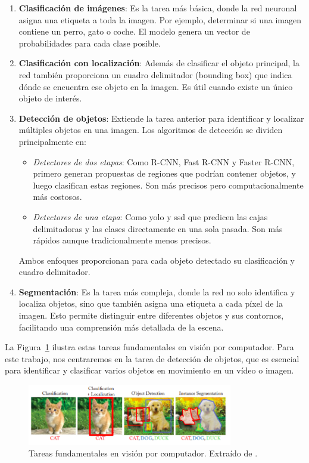 \documentclass[11pt,spanish,listoffigures,listoftables]{tfgetsinf}
\begin{document}
\begin{enumerate}
    \item \textbf{Clasificación de imágenes}: Es la tarea más básica, donde la red neuronal asigna una etiqueta a toda la imagen. Por ejemplo, determinar si una imagen contiene un perro, gato o coche. El modelo genera un vector de probabilidades para cada clase posible.
    
    \item \textbf{Clasificación con localización}: Además de clasificar el objeto principal, la red también proporciona un cuadro delimitador (bounding box) que indica dónde se encuentra ese objeto en la imagen. Es útil cuando existe un único objeto de interés.
    
   \item \textbf{Detección de objetos}: Extiende la tarea anterior para identificar y localizar múltiples objetos en una imagen. Los algoritmos de detección se dividen principalmente en:
      \begin{itemize}
         \item \textit{Detectores de dos etapas}: Como R-CNN, Fast R-CNN y Faster R-CNN, primero generan propuestas de regiones que podrían contener objetos, y luego clasifican estas regiones. Son más precisos pero computacionalmente más costosos.
         \item \textit{Detectores de una etapa}: Como \gls{yolo} y \gls{ssd} que predicen las cajas delimitadoras y las clases directamente en una sola pasada. Son más rápidos aunque tradicionalmente menos precisos.
      \end{itemize}
      Ambos enfoques proporcionan para cada objeto detectado su clasificación y cuadro delimitador.
    
    \item \textbf{Segmentación}: Es la tarea más compleja, donde la red no solo identifica y localiza objetos, sino que también asigna una etiqueta a cada píxel de la imagen. Esto permite distinguir entre diferentes objetos y sus contornos, facilitando una comprensión más detallada de la escena.
\end{enumerate}

La Figura~\ref{fig:tareas_vision_por_computador} ilustra estas tareas fundamentales en visión por computador. Para este trabajo, nos centraremos en la tarea de detección de objetos, que es esencial para identificar y clasificar varios objetos en movimiento en un vídeo o imagen.

\begin{figure}[H]
   \centering
   \includegraphics[width=0.8\textwidth]{images/estado_del_arte/diferentes_formas_de_detectar.png}
   \caption[Tareas fundamentales en visión por computador]{Tareas fundamentales en visión por computador. Extraído de \cite[fig. 1.1, p. ~2]{khan2018guide}.}
   \label{fig:tareas_vision_por_computador}
\end{figure}
\end{document}
